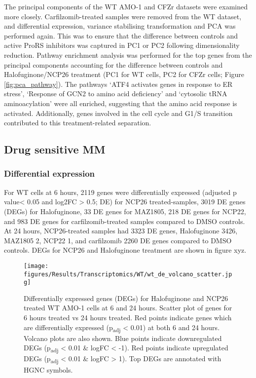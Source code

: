 The principal components of the WT AMO-1 and CFZr datasets were examined more closely.
Carfilzomib-treated samples were removed from the WT dataset, and differential expression, variance stabilising transformation and PCA was performed again.
This was to ensure that the difference between controls and active ProRS inhibitors was captured in PC1 or PC2 following dimensionality reduction.
Pathway enrichment analysis was performed for the top genes from the principal components accounting for the difference between controls and Halofuginone/NCP26 treatment (PC1 for WT cells, PC2 for CFZr cells; Figure \ref{fig:pca_pathway}).
The pathways `ATF4 activates genes in response to ER stress', `Response of GCN2 to amino acid deficiency' and `cytosolic tRNA aminoacylation' were all enriched, suggesting that the amino acid response is activated.
Additionally, genes involved in the cell cycle and G1/S transition contributed to this treatment-related separation.

\subsection{Drug sensitive MM}

\subsubsection{Differential expression}
For WT cells at 6 hours, 2119 genes were differentially expressed (adjusted p value< 0.05 and log2FC > 0.5; DE) for NCP26 treated-samples, 3019 DE genes (DEGs) for Halofuginone, 33 DE genes for MAZ1805, 218 DE genes for NCP22, and 983 DE genes for carfilzomib-treated samples compared to DMSO controls.
At 24 hours, NCP26-treated samples had 3323 DE genes, Halofuginone 3426, MAZ1805 2, NCP22 1, and carfilzomib 2260 DE genes compared to DMSO controls.
DEGs for NCP26 and Halofuginone treatment are shown in figure xyz.

\begin{figure}[htb]
\centering
\texttt{[image: figures/Results/Transcriptomics/WT/wt\_de\_volcano\_scatter.jpg]}
\caption[Differentially expressed genes WT AMO-1 cells]{Differentially expressed genes (DEGs) for Halofuginone and NCP26 treated WT AMO-1 cells at 6 and 24 hours.
Scatter plot of genes for 6 hours treated vs 24 hours treated.
Red points indicate genes which are differentially expressed (p\textsubscript{adj} < 0.01) at both 6 and 24 hours.
Volcano plots are also shown.
Blue points indicate downregulated DEGs (p\textsubscript{adj} < 0.01 \& logFC < -1).
Red points indicate upregulated DEGs (p\textsubscript{adj} < 0.01 \& logFC > 1).
Top DEGs are annotated with HGNC symbols.
}
\label{fig:wt_de}
\end{figure}

